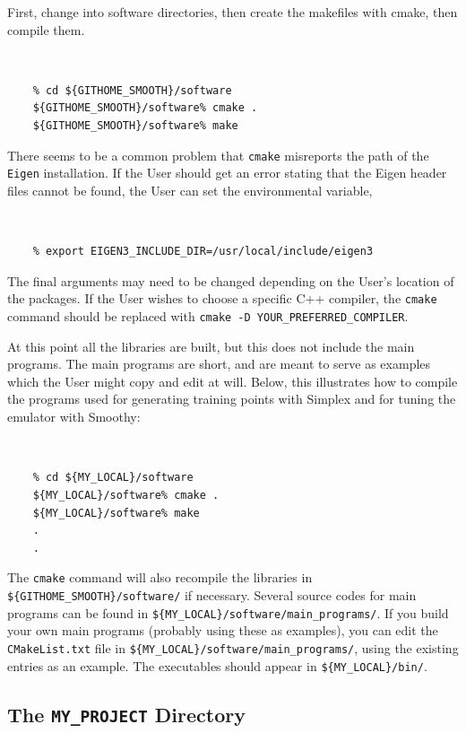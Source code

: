 \documentclass[UserManual.tex]{subfiles}
\begin{document}
First, change into software directories, then create the makefiles with cmake, then compile them.
{\tt 
\begin{verbatim}
    % cd ${GITHOME_SMOOTH}/software
    ${GITHOME_SMOOTH}/software% cmake .
    ${GITHOME_SMOOTH}/software% make
\end{verbatim}
}
There seems to be a common problem that {\tt cmake} misreports the path of the {\tt Eigen} installation. If the User should get an error stating that the Eigen header files cannot be found, the User can set the environmental variable,
{\tt 
\begin{verbatim}
    % export EIGEN3_INCLUDE_DIR=/usr/local/include/eigen3
\end{verbatim}
}
The final arguments may need to be changed depending on the User's location of the packages. If the User wishes to choose a specific C++ compiler, the {\tt cmake} command should be replaced with {\tt cmake -D YOUR\_PREFERRED\_COMPILER}. 

At this point all the libraries are built, but this does not include the main programs. The main programs are short, and are meant to serve as examples which the User might copy and edit at will. Below, this illustrates how to compile the programs used for generating training points with Simplex and for tuning the emulator with Smoothy:
{\tt
\begin{verbatim}
    % cd ${MY_LOCAL}/software
    ${MY_LOCAL}/software% cmake .
    ${MY_LOCAL}/software% make
    .
    .
\end{verbatim}
}
The {\tt cmake} command will also recompile the libraries in {\tt \$\{GITHOME\_SMOOTH\}/software/} if necessary. Several source codes for main programs can be found in {\tt \$\{MY\_LOCAL\}/software/main\_programs/}. If you build your own main programs (probably using these as examples), you can edit the {\tt CMakeList.txt} file in {\tt \$\{MY\_LOCAL\}/software/main\_programs/}, using the existing entries as an example. The executables should appear in {\tt \$\{MY\_LOCAL\}/bin/}. 

\subsection{The {\tt MY\_PROJECT} Directory}
\end{document}
